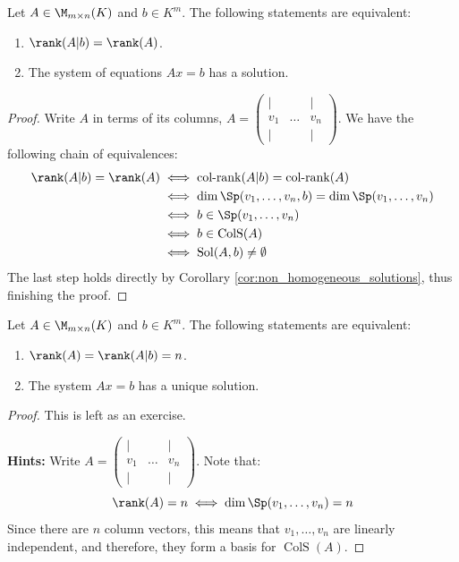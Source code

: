 \begin{proposition}
\label{prop:rank_solvability_criterion}
Let $A \in \M_{m \times n}(K)$ and $b \in K^m$. The following statements are equivalent:
\begin{enumerate}
    \item $\rank(A|b) = \rank(A)$.
    \item The system of equations $Ax = b$ has a solution.
\end{enumerate}
\end{proposition}

\begin{proof}
Write $A$ in terms of its columns, $A = \begin{pmatrix} | & & | \\ v_1 & \dots & v_n \\ | & & | \end{pmatrix}$. We have the following chain of equivalences:
\begin{align*}
    \rank(A|b) = \rank(A) &\iff \operatorname{col-rank}(A|b) = \operatorname{col-rank}(A) \\
    &\iff \dim \Sp(v_1, \dots, v_n, b) = \dim \Sp(v_1, \dots, v_n) \\
    &\iff b \in \Sp(v_1, \dots, v_n) \\
    &\iff b \in \operatorname{ColS}(A) \\
    &\iff \operatorname{Sol}(A, b) \neq \emptyset
\end{align*}
The last step holds directly by Corollary \ref{cor:non_homogeneous_solutions}, thus finishing the proof.
\end{proof}

\begin{proposition}
\label{prop:unique_solution_rank_criterion}
Let $A \in \M_{m \times n}(K)$ and $b \in K^m$. The following statements are equivalent:
\begin{enumerate}
    \item $\rank(A) = \rank(A|b) = n$.
    \item The system $Ax = b$ has a unique solution.
\end{enumerate}
\end{proposition}

\begin{proof}
This is left as an exercise.

\textbf{Hints:} Write $A = \begin{pmatrix} | & & | \\ v_1 & \dots & v_n \\ | & & | \end{pmatrix}$. Note that:
\begin{equation*}
    \rank(A) = n \iff \dim \Sp(v_1, \dots, v_n) = n
\end{equation*}
Since there are $n$ column vectors, this means that $v_1, \dots, v_n$ are linearly independent, and therefore, they form a basis for $\operatorname{ColS}(A)$.
\end{proof}

